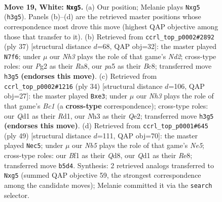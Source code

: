 \documentclass[11pt]{article}
\begin{document}
\clearpage

\begin{figure}[p]\centering
\begin{subfigure}{0.46\textwidth}\centering
\resizebox{\linewidth}{!}{%
\newchessgame
\chessboard[
  setfen={rn1k3r/3n4/bp2p3/pNq1Ppp1/2P2P1p/7N/P2K2PP/R2Q1B1R w - - 0 19},
  showmover=false,
  pgfstyle=straightmove, color=movearrow, markmove={h3-g5}
]}
\caption{}
\end{subfigure}\hfill
\begin{subfigure}{0.46\textwidth}\centering
\resizebox{\linewidth}{!}{%
\newchessgame
\chessboard[
  setfen={r1b3rk/1p1nq3/2p1p3/p2n1pp1/3P4/1QN1P3/PP1N1P1P/2R2BRK b - - 1 19},
  showmover=false,
  pgfstyle=straightmove, color=movearrow, markmove={d7-f6}
]}
\caption{}
\end{subfigure}
\\[4pt]
\begin{subfigure}{0.46\textwidth}\centering
\resizebox{\linewidth}{!}{%
\newchessgame
\chessboard[
  setfen={rn1qrbk1/pp1n1p1p/6p1/1P1Np1P1/P3P3/4p3/1P2QP1P/R1BR2K1 w - - 0 18},
  showmover=false,
  pgfstyle=straightmove, color=movearrow, markmove={c1-e3}
]}
\caption{}
\end{subfigure}\hfill
\begin{subfigure}{0.46\textwidth}\centering
\resizebox{\linewidth}{!}{%
\newchessgame
\chessboard[
  setfen={3qr1k1/2b2ppp/8/p2p1Q2/Pp1Nn1N1/1P1nPP2/1B4PP/5RK1 b - - 0 25},
  showmover=false,
  pgfstyle=straightmove, color=movearrow, markmove={e4-c5}
]}
\caption{}
\end{subfigure}
\caption{\textbf{Move 19, White: \texttt{Nxg5}.} (a) Our position; Melanie plays \texttt{Nxg5} (\texttt{h3g5}). Panels (b)--(d) are the retrieved master positions whose correspondence most drove this move (highest QAP objective among those that transfer to it). (b) Retrieved from \texttt{ccrl\_top\_p0002\#2892} (ply 37) [structural distance $d$=68, QAP obj=32]: the master played \texttt{N7f6}; under $\mu$ our \emph{Nh3} plays the role of that game's \emph{Nd2}; cross-type roles: our \emph{P}g2 as their \emph{R}a8, our \emph{p}a5 as their \emph{B}c8; transferred move \texttt{h3g5} \textbf{(endorses this move)}. (c) Retrieved from \texttt{ccrl\_top\_p0002\#1216} (ply 34) [structural distance $d$=106, QAP obj=27]: the master played \texttt{Bxe3}; under $\mu$ our \emph{Nh3} plays the role of that game's \emph{Bc1} (a \textbf{cross-type} correspondence); cross-type roles: our \emph{Q}d1 as their \emph{R}d1, our \emph{N}h3 as their \emph{Q}e2; transferred move \texttt{h3g5} \textbf{(endorses this move)}. (d) Retrieved from \texttt{ccrl\_top\_p0001\#645} (ply 49) [structural distance $d$=111, QAP obj=70]: the master played \texttt{Nec5}; under $\mu$ our \emph{Nb5} plays the role of that game's \emph{Ne5}; cross-type roles: our \emph{B}f1 as their \emph{Q}d8, our \emph{Q}d1 as their \emph{R}e8; transferred move \texttt{b5d4}. Synthesis: 2 retrieved analogs transferred to \texttt{Nxg5} (summed QAP objective 59, the strongest correspondence among the candidate moves); Melanie committed it via the \texttt{search} selector.}
\label{fig:thought-m36}
\end{figure}
\end{document}
